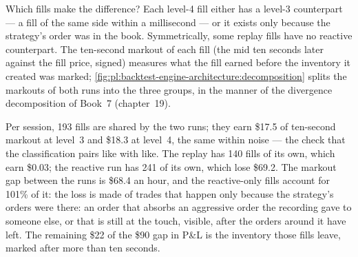 Which fills make the difference? Each level-4 fill either has a level-3 counterpart --- a fill of the same side within a millisecond ---
or it exists only because the strategy's order was in the book. Symmetrically, some replay fills have no reactive counterpart. The
ten-second markout of each fill (the mid ten seconds later against the fill price, signed) measures what the fill earned before the
inventory it created was marked; \cref{fig:pl:backtest-engine-architecture:decomposition} splits the markouts of both runs into the three
groups, in the manner of the divergence decomposition of Book~7 (chapter~19).

\begin{omfigure}

\label{fig:pl:backtest-engine-architecture:decomposition}
\end{omfigure}

\begin{example}\label{ex:pl:backtest-engine-architecture:gap}
Per session, 193 fills are shared by the two runs; they earn \$17.5 of ten-second markout at level~3 and \$18.3 at level~4, the same
within noise --- the check that the classification pairs like with like. The replay has 140 fills of its own, which earn \$0.03; the
reactive run has 241 of its own, which lose \$69.2. The markout gap between the runs is \$68.4 an hour, and the reactive-only fills account
for 101\% of it: the loss is made of trades that happen only because the strategy's orders were there: an order that absorbs an aggressive order the
recording gave to someone else, or that is still at the touch, visible, after the orders around it have left. The remaining \$22 of the \$90
gap in P\&L is the inventory those fills leave, marked after more than ten seconds.
\end{example}


